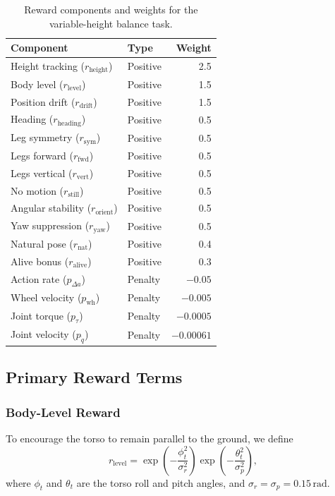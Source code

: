 \documentclass[conference]{IEEEtran}
\begin{document}
\begin{table}[t]
\centering
\caption{Reward components and weights for the variable-height balance task.}
\label{tab:reward_weights}
\begin{tabular}{l l r}
\toprule
Component & Type & Weight \\
\midrule
Height tracking ($r_{\mathrm{height}}$) & Positive & 2.5 \\
Body level ($r_{\mathrm{level}}$) & Positive & 1.5 \\
Position drift ($r_{\mathrm{drift}}$) & Positive & 1.5 \\
Heading ($r_{\mathrm{heading}}$) & Positive & 0.5 \\
Leg symmetry ($r_{\mathrm{sym}}$) & Positive & 0.5 \\
Legs forward ($r_{\mathrm{fwd}}$) & Positive & 0.5 \\
Legs vertical ($r_{\mathrm{vert}}$) & Positive & 0.5 \\
No motion ($r_{\mathrm{still}}$) & Positive & 0.5 \\
Angular stability ($r_{\mathrm{orient}}$) & Positive & 0.5 \\
Yaw suppression ($r_{\mathrm{yaw}}$) & Positive & 0.5 \\
Natural pose ($r_{\mathrm{nat}}$) & Positive & 0.4 \\
Alive bonus ($r_{\mathrm{alive}}$) & Positive & 0.3 \\
Action rate ($p_{\Delta a}$) & Penalty & $-0.05$ \\
Wheel velocity ($p_{\mathrm{wh}}$) & Penalty & $-0.005$ \\
Joint torque ($p_\tau$) & Penalty & $-0.0005$ \\
Joint velocity ($p_{\dot{q}}$) & Penalty & $-0.00061$ \\
\bottomrule
\end{tabular}
\end{table}

\subsection{Primary Reward Terms}

\subsubsection{Body-Level Reward}
To encourage the torso to remain parallel to the ground, we define
\begin{equation}
r_{\mathrm{level}} =
\exp\left(-\frac{\phi_t^2}{\sigma_r^2}\right)
\exp\left(-\frac{\theta_t^2}{\sigma_p^2}\right),
\label{eq:body_level}
\end{equation}
where $\phi_t$ and $\theta_t$ are the torso roll and pitch angles, and $\sigma_r = \sigma_p = 0.15\,\mathrm{rad}$.
\end{document}
